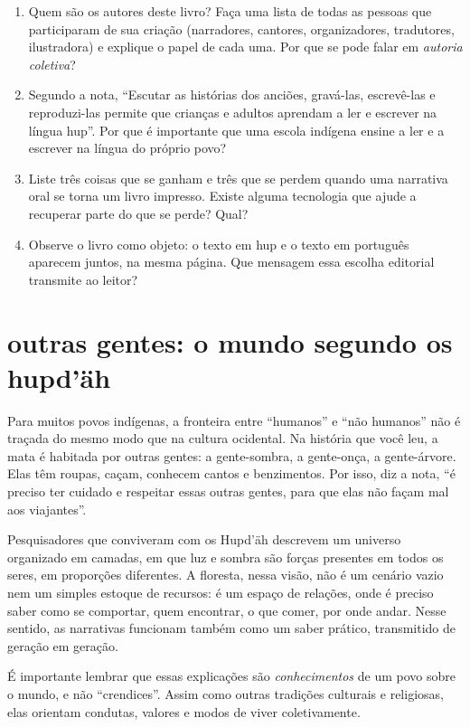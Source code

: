 \begin{enumerate}[label=\arabic*.]
\item Quem são os autores deste livro? Faça uma lista de todas as
pessoas que participaram de sua criação (narradores, cantores,
organizadores, tradutores, ilustradora) e explique o papel de cada uma.
Por que se pode falar em \textit{autoria coletiva}?
\item Segundo a nota, ``Escutar as histórias dos anciões, gravá-las,
escrevê-las e reproduzi-las permite que crianças e adultos aprendam a
ler e escrever na língua hup''. Por que é importante que uma escola
indígena ensine a ler e a escrever na língua do próprio povo?
\item Liste três coisas que se ganham e três que se perdem quando uma
narrativa oral se torna um livro impresso. Existe alguma tecnologia que
ajude a recuperar parte do que se perde? Qual?
\item Observe o livro como objeto: o texto em hup e o texto em português
aparecem juntos, na mesma página. Que mensagem essa escolha editorial
transmite ao leitor?
\end{enumerate}

\section{outras gentes: o mundo segundo os hupd'äh}

Para muitos povos indígenas, a fronteira entre ``humanos'' e ``não
humanos'' não é traçada do mesmo modo que na cultura ocidental. Na
história que você leu, a mata é habitada por outras gentes: a
gente-sombra, a gente-onça, a gente-árvore. Elas têm roupas, caçam,
conhecem cantos e benzimentos. Por isso, diz a nota, ``é preciso ter
cuidado e respeitar essas outras gentes, para que elas não façam mal aos
viajantes''.

Pesquisadores que conviveram com os Hupd'äh descrevem um universo
organizado em camadas, em que luz e sombra são forças presentes em todos
os seres, em proporções diferentes. A floresta, nessa visão, não é um
cenário vazio nem um simples estoque de recursos: é um espaço de
relações, onde é preciso saber como se comportar, quem encontrar, o que
comer, por onde andar. Nesse sentido, as narrativas funcionam também
como um saber prático, transmitido de geração em geração.

É importante lembrar que essas explicações são \textit{conhecimentos} de
um povo sobre o mundo, e não ``crendices''. Assim como outras tradições
culturais e religiosas, elas orientam condutas, valores e modos de viver
coletivamente.

